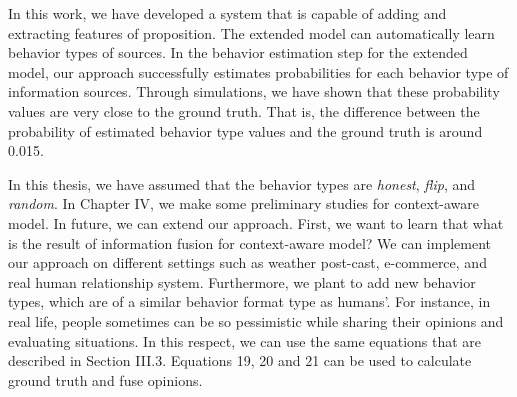 \documentclass[a4,12pt]{ozu-thesis}
\begin{document}
In this work, we have developed a system that is capable of adding and extracting features of proposition. The extended model can automatically learn behavior types of sources. In the behavior estimation step for the extended model, our approach successfully estimates probabilities for each behavior type of information sources. Through simulations, we have shown that these probability values are very close to the ground truth. That is, the difference between the probability of estimated behavior type values and the ground truth is around 0.015. 


In this thesis, we have assumed that the behavior types are \textit{honest}, \textit{flip}, and \textit{random}. In Chapter IV, we make some preliminary studies for context-aware model. In future, we can extend our approach. First, we want to learn that what is the result of information fusion for context-aware model? We can implement our approach on different settings such as weather post-cast, e-commerce, and real human relationship system. Furthermore, we plant to add new behavior types, which are of a similar behavior format type as humans’. For instance, in real life, people sometimes can be so pessimistic while sharing their opinions and evaluating situations. In this respect, we can use the same equations that are described in Section III.3. Equations 19, 20 and 21 can be used to calculate ground truth and fuse opinions. 

 

\nocite{*}


\begin{thebibliography}{99}



\end{thebibliography}


\appendix

\begin{postliminary}

\end{postliminary}
\end{document}
